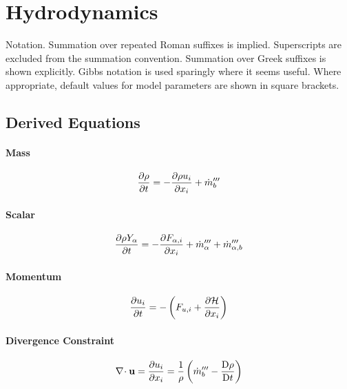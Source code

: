 \documentclass[11pt]{article}
\begin{document}
\section{Hydrodynamics}

Notation.  Summation over repeated Roman suffixes is implied.  Superscripts are excluded from the summation convention.  Summation over Greek suffixes is shown explicitly.  Gibbs notation is used sparingly where it seems useful. Where appropriate, default values for model parameters are shown in square brackets.

\subsection{Derived Equations}

\paragraph{Mass}

\begin{equation}
\label{eqn_mass}
\frac{\partial \rho}{\partial t} = - \frac{\partial \rho u_i}{\partial x_i} + \dot{m}_b^{\prime\prime\prime}
\end{equation}

\paragraph{Scalar}

\begin{equation}
\label{eqn_scalar}
\frac{\partial \rho Y_\alpha}{\partial t} = - \frac{\partial F_{\alpha,i}}{\partial x_i} + \dot{m}_{\alpha}^{\prime\prime\prime} + \dot{m}_{\alpha,b}^{\prime\prime\prime}
\end{equation}

\paragraph{Momentum}

\begin{equation}
\label{eqn_momentum}
\frac{\partial u_i}{\partial t} = - \left( F_{u,i} + \frac{\partial \cal H}{\partial x_i} \right)
\end{equation}

\paragraph{Divergence Constraint}

\begin{equation}
\label{eqn_divergence}
\nabla\!\cdot \mathbf{u} = \frac{\partial u_i}{\partial x_i} = \frac{1}{\rho}\left(\dot{m}_b^{\prime\prime\prime} - \frac{\mbox{D}\rho}{\mbox{D}t}\right)
\end{equation}
\end{document}
